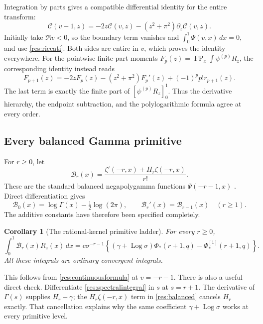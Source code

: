 \documentclass[11pt,a4paper]{article}
\numberwithin{equation}{section}
\newtheorem{corollary}[theorem]{Corollary}
\theoremstyle{definition}
\theoremstyle{remark}
\DeclareMathOperator{\Log}{Log}
\begin{document}
Integration by parts gives a compatible differential identity for
the entire transform:
\begin{equation}\label{res:continuous-recurrence}
 \mathcal C(v+1,z)
      =-2z\mathcal C(v,z)-(z^2+\pi^2)\partial_z\mathcal C(v,z).
\end{equation}
Initially take $\Re v<0$, so the boundary term vanishes and
$\int_0^1\Psi(v,x)\,dx=0$, and use \eqref{res:riccati}.
Both sides are entire in $v$, which proves the identity everywhere.
For the pointwise finite-part moments
$F_p(z)=\operatorname{FP}_x\int\psi^{(p)}R_z$, the corresponding
identity instead reads
\begin{equation}\label{res:pointwise-recurrence}
 F_{p+1}(z)=-2zF_p(z)-(z^2+\pi^2)F_p'(z)
                         +(-1)^pp!r_{p+1}(z).
\end{equation}
The last term is exactly the finite part of $[\psi^{(p)}R_z]_0^1$.
Thus the derivative hierarchy, the endpoint subtraction, and the
polylogarithmic formula agree at every order.

\subsection{Every balanced Gamma primitive}

For $r\ge0$, let
\begin{equation}\label{res:balanced}
 \mathcal B_r(x)=\frac{\zeta'(-r,x)+H_r\zeta(-r,x)}{r!}.
\end{equation}
These are the standard balanced negapolygamma functions
$\Psi(-r-1,x)$ \cite{EM}. Direct differentiation gives
\[
 \mathcal B_0(x)=\log\Gamma(x)-\tfrac12\log(2\pi),\qquad
 \mathcal B_r'(x)=\mathcal B_{r-1}(x)\quad(r\ge1).
\]
The additive constants have therefore been specified completely.

\begin{corollary}[The rational-kernel primitive ladder]
\label{res:balancedcor}
For every $r\ge0$,
\begin{equation}\label{res:balancedmoment}
 \int_0^1\mathcal B_r(x)R_z(x)\,dx
    =c\sigma^{-r-1}
       \left\{(\gamma+\Log\sigma)\Phi_*(r+1,q)
                                      -\Phi_*^{[1]}(r+1,q)\right\}.
\end{equation}
All these integrals are ordinary convergent integrals.
\end{corollary}

This follows from \eqref{res:continuousformula} at $v=-r-1$.
There is also a useful direct check. Differentiate
\eqref{res:spectralintegral} in $s$ at $s=r+1$. The derivative of
$\Gamma(s)$ supplies $H_r-\gamma$; the $H_r\zeta(-r,x)$ term
in \eqref{res:balanced} cancels $H_r$ exactly. That cancellation
explains why the same coefficient $\gamma+\Log\sigma$ works at
every primitive level.
\end{document}
